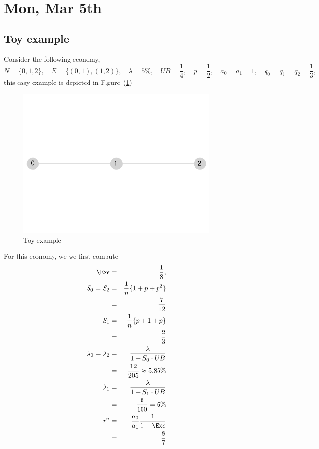 \section{Mon, Mar 5th}
\subsection{Toy example}
Consider the following economy, 
\[N=\{0,1,2\},\quad E=\{(0,1),(1,2)\},\quad \lambda=5\%,\quad UB=\frac{1}{4},\quad p=\frac{1}{2},\quad a_0=a_1=1,\quad q_0=q_1=q_2=\frac{1}{3},\]
this easy example is depicted in Figure~(\ref{figToyNtw})
\begin{figure}[htbp]
   \centering
   \includegraphics[width=0.9\textwidth]{ToyNtw} %
   \caption{Toy example}
   \label{figToyNtw}
\end{figure}
For this economy, we we first compute
\begin{eqnarray*}
\Ex\epsilon&=&\frac{1}{8},\\
S_0=S_2&=&\frac{1}{n}\{1+p+p^2\}\\
&=&\frac{7}{12}\\
S_1&=&\frac{1}{n}\{p+1+p\}\\
&=&\frac{2}{3}\\
\lambda_0=\lambda_2&=&\frac{\lambda}{1-S_0\cdot UB}\\
&=&\frac{12}{205}\approx 5.85\%\\
\lambda_1&=&\frac{\lambda}{1-S_1\cdot UB}\\
&=&\frac{6}{100}=6\%\\
r^u&=&\frac{a_0}{a_1}\frac{1}{1-\Ex\epsilon}\\
&=&\frac{8}{7}
\end{eqnarray*}
